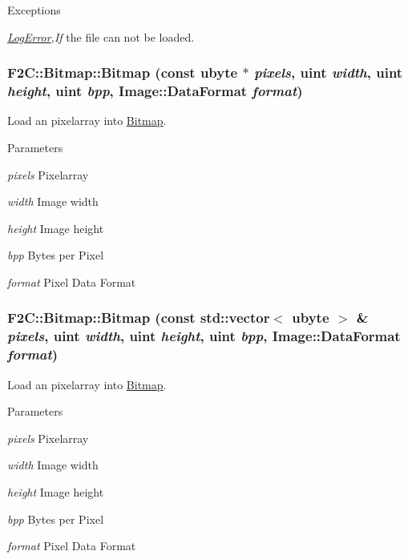 \begin{DoxyExceptions}{Exceptions}
\item[{\em \hyperlink{class_f2_c_1_1_log_error}{LogError},If}]the file can not be loaded. \end{DoxyExceptions}
\hypertarget{class_f2_c_1_1_bitmap_a073dc6afa7a1f97907f60359210b1d6b}{
\subsubsection[{Bitmap}]{\setlength{\rightskip}{0pt plus 5cm}F2C::Bitmap::Bitmap (const {\bf ubyte} $\ast$ {\em pixels}, \/  {\bf uint} {\em width}, \/  {\bf uint} {\em height}, \/  {\bf uint} {\em bpp}, \/  Image::DataFormat {\em format})}}
\label{class_f2_c_1_1_bitmap_a073dc6afa7a1f97907f60359210b1d6b}


Load an pixelarray into \hyperlink{class_f2_c_1_1_bitmap}{Bitmap}. 
\begin{DoxyParams}{Parameters}
\item[{\em pixels}]Pixelarray \item[{\em width}]Image width \item[{\em height}]Image height \item[{\em bpp}]Bytes per Pixel \item[{\em format}]Pixel Data Format \end{DoxyParams}
\hypertarget{class_f2_c_1_1_bitmap_a06332b232319d4b47679ac58a37b7c2e}{
\subsubsection[{Bitmap}]{\setlength{\rightskip}{0pt plus 5cm}F2C::Bitmap::Bitmap (const std::vector$<$ {\bf ubyte} $>$ \& {\em pixels}, \/  {\bf uint} {\em width}, \/  {\bf uint} {\em height}, \/  {\bf uint} {\em bpp}, \/  Image::DataFormat {\em format})}}
\label{class_f2_c_1_1_bitmap_a06332b232319d4b47679ac58a37b7c2e}


Load an pixelarray into \hyperlink{class_f2_c_1_1_bitmap}{Bitmap}. 
\begin{DoxyParams}{Parameters}
\item[{\em pixels}]Pixelarray \item[{\em width}]Image width \item[{\em height}]Image height \item[{\em bpp}]Bytes per Pixel \item[{\em format}]Pixel Data Format \end{DoxyParams}


